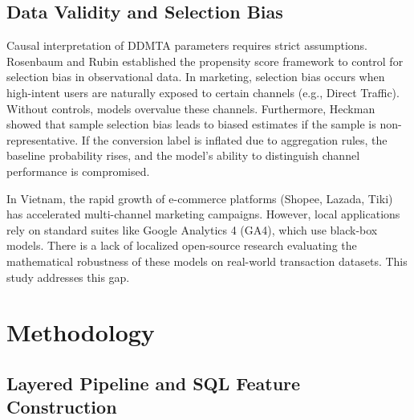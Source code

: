 \documentclass[pdflatex,sn-basic,Numbered]{sn-jnl}
\begin{document}
\subsection{Data Validity and Selection Bias}

Causal interpretation of DDMTA parameters requires strict assumptions. Rosenbaum and Rubin \cite{rosenbaum1983propensity} established the propensity score framework to control for selection bias in observational data. In marketing, selection bias occurs when high-intent users are naturally exposed to certain channels (e.g., Direct Traffic). Without controls, models overvalue these channels. Furthermore, Heckman \cite{heckman1979sample} showed that sample selection bias leads to biased estimates if the sample is non-representative. If the conversion label is inflated due to aggregation rules, the baseline probability rises, and the model's ability to distinguish channel performance is compromised.

In Vietnam, the rapid growth of e-commerce platforms (Shopee, Lazada, Tiki) has accelerated multi-channel marketing campaigns. However, local applications rely on standard suites like Google Analytics 4 (GA4), which use black-box models. There is a lack of localized open-source research evaluating the mathematical robustness of these models on real-world transaction datasets. This study addresses this gap.

\section{Methodology}\label{sec:methodology}

\subsection{Layered Pipeline and SQL Feature Construction}
\end{document}
